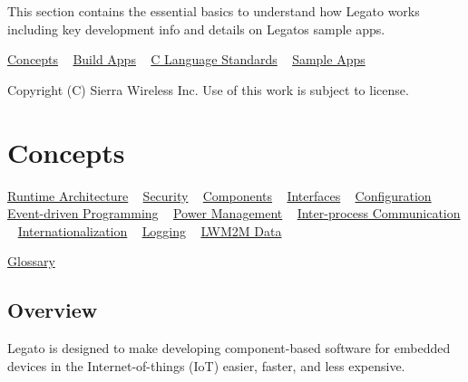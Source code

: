 This section contains the essential basics to understand how Legato works including key development info and details on Legato\textquotesingle{}s sample apps.





\hyperlink{basicConcepts}{Concepts} ~\newline
 \hyperlink{basicApps}{Build Apps} ~\newline
 \hyperlink{ccodingStdsMain}{C Language Standards} ~\newline
 \hyperlink{sampleApps}{Sample Apps}





Copyright (C) Sierra Wireless Inc. Use of this work is subject to license. \hypertarget{basicConcepts}{}\section{Concepts}\label{basicConcepts}
\hyperlink{basicRuntimeArch}{Runtime Architecture} ~\newline
 \hyperlink{basicSecurity}{Security} ~\newline
 \hyperlink{basicComponents}{Components} ~\newline
 \hyperlink{basicInterfaces}{Interfaces} ~\newline
 \hyperlink{basicConfig}{Configuration} ~\newline
 \hyperlink{basicEvents}{Event-\/driven Programming} ~\newline
 \hyperlink{basicPwrMgmt}{Power Management} ~\newline
 \hyperlink{basicIPC}{Inter-\/process Communication} ~\newline
 \hyperlink{basicInternationalization}{Internationalization} ~\newline
 \hyperlink{basicLog}{Logging} ~\newline
 \hyperlink{basicLWM2MData}{L\+W\+M2\+M Data}

\hyperlink{aboutDocsGlossary}{Glossary} ~\newline


\subsection*{Overview}

Legato is designed to make developing component-\/based software for embedded devices in the Internet-\/of-\/things (Io\+T) easier, faster, and less expensive.







